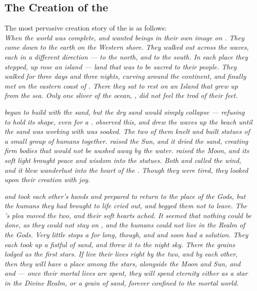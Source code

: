 \documentclass[blue]{GL2020}
\begin{document}
\subsection*{The Creation of the \pShippies{}}
The most pervasive creation story of the \pShippies{} is as follows:\\
\emph{When the world was complete, \cEbb{} and \cFlow{} wanted beings in their own image on \pEarth{}. They came down to the earth on the Western shore. They walked out across the waves, each in a different direction — \cEbb{} to the north, and \cFlow{} to the south. In each place they stepped, up rose an island — land that was to be sacred to their people. They walked for three days and three nights, curving around the continent, and finally met on the eastern coast of \pEarth{}. There they sat to rest on an Island that grew up from the sea. Only one sliver of the ocean, \pWod{}, did not feel the trod of their feet.}

\emph{\cFlow{} began to build with the sand, but the dry sand would simply collapse — refusing to hold its shape, even for a \cFlow{\God}. \cEbb{} observed this, and drew the waves up the beach until the sand \cFlow{} was working with was soaked. The two of them knelt and built statues of a small group of humans together. \cFlow{} raised the Sun, and it dried the sand, creating firm bodies that would not be washed away by the water. \cEbb{} raised the Moon, and its soft light brought peace and wisdom into the statues. Both \cEbb{} and \cFlow{} called the wind, and it blew wanderlust into the heart of the \pShippies{}. Though they were tired, they looked upon their creation with joy.}

\emph{\cEbb{} and \cFlow{} took each other's hands and prepared to return to the place of the Gods, but the humans they had brought to life cried out, and begged them not to leave. The \pShippies{}'s plea moved the two, and their soft hearts ached. It seemed that nothing could be done, as they could not stay on \pEarth{}, and the humans could not live in the Realm of the Gods. Very little stops a \cEbb{\God} for long, though, and \cEbb{} and \cFlow{} soon had a solution. They each took up a fistful of sand, and threw it to the night sky. There the grains lodged as the first stars. If \pShippies{} live their lives right by the two, and by each other, then they will have a place among the stars, alongside the Moon and Sun, and \cEbb{} and \cFlow{} — once their mortal lives are spent, they will spend eternity either as a star in the Divine Realm, or a grain of sand, forever confined to the mortal world.}
\end{document}

